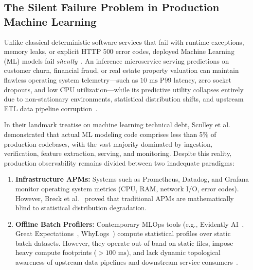 \documentclass[conference]{IEEEtran}
\begin{document}
\subsection{The Silent Failure Problem in Production Machine Learning}
Unlike classical deterministic software services that fail with runtime exceptions, memory leaks, or explicit HTTP 500 error codes, deployed Machine Learning (ML) models fail \textit{silently}~\cite{sculley2015}. An inference microservice serving predictions on customer churn, financial fraud, or real estate property valuation can maintain flawless operating system telemetry---such as $10\text{ ms}$ P99 latency, zero socket dropouts, and low CPU utilization---while its predictive utility collapses entirely due to non-stationary environments, statistical distribution shifts, and upstream ETL data pipeline corruption~\cite{breck2019, shankar2022}.

In their landmark treatise on machine learning technical debt, Sculley et al.~\cite{sculley2015} demonstrated that actual ML modeling code comprises less than 5\% of production codebases, with the vast majority dominated by ingestion, verification, feature extraction, serving, and monitoring. Despite this reality, production observability remains divided between two inadequate paradigms:
\begin{enumerate}
    \item \textbf{Infrastructure APMs:} Systems such as Prometheus, Datadog, and Grafana monitor operating system metrics (CPU, RAM, network I/O, error codes). However, Breck et al.~\cite{breck2019} proved that traditional APMs are mathematically blind to statistical distribution degradation.
    \item \textbf{Offline Batch Profilers:} Contemporary MLOps tools (e.g., Evidently AI~\cite{evidently}, Great Expectations~\cite{greatexp}, WhyLogs~\cite{whylogs}) compute statistical profiles over static batch datasets. However, they operate out-of-band on static files, impose heavy compute footprints ($>100\text{ ms}$), and lack dynamic topological awareness of upstream data pipelines and downstream service consumers~\cite{shankar2022}.
\end{enumerate}
\end{document}
